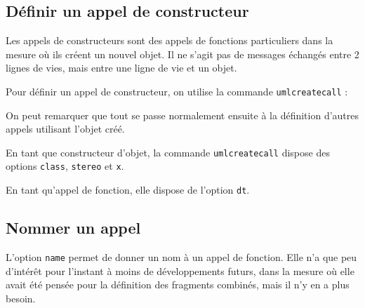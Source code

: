 \documentclass[a4paper,11pt]{report}
\newcommand{\inputTikZ}[1]{%
  }%
\newcommand{\inputTikZ}[1]{%
    \texttt{[image: fig/\#1.pdf]}%
  }%
\begin{document}
\medskip

\begin{minipage}{0.5\textwidth}

\end{minipage}
\begin{minipage}{0.5\textwidth}
\begin{center}
\inputTikZ{callreturnonly}
\end{center}
\end{minipage}

\subsection{Définir un appel de constructeur}\label{ss.create}

Les appels de constructeurs sont des appels de fonctions particuliers dans la mesure où ils créent un nouvel objet. Il ne s'agit pas de messages échangés entre 2 lignes de vies, mais entre une ligne de vie et un objet.

Pour définir un appel de constructeur, on utilise la commande {\tt umlcreatecall} :

\medskip

\begin{minipage}{0.5\textwidth}

\end{minipage}
\begin{minipage}{0.5\textwidth}
\begin{center}
\inputTikZ{createcall}
\end{center}
\end{minipage}

\medskip

On peut remarquer que tout se passe normalement ensuite à la définition d'autres appels utilisant l'objet créé.

\medskip

En tant que constructeur d'objet, la commande {\tt umlcreatecall} dispose des options {\tt class}, {\tt stereo} et {\tt x}.

En tant qu'appel de fonction, elle dispose de l'option {\tt dt}.

\subsection{Nommer un appel}\label{ss.callname}

L'option {\tt name} permet de donner un nom à un appel de fonction. Elle n'a que peu d'intérêt pour l'instant à moins de développements futurs, dans la mesure où elle avait été pensée pour la définition des fragments combinés, mais il n'y en a plus besoin.
\end{document}
